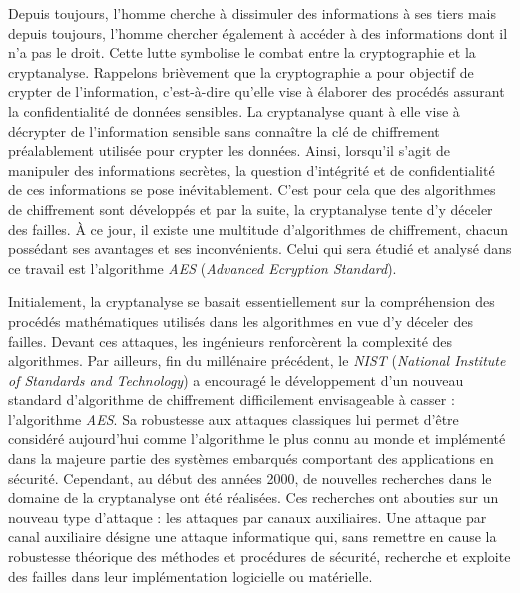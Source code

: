\documentclass[oneside]{book}
\begin{document}
Depuis toujours, l’homme cherche à dissimuler des informations à ses tiers mais depuis toujours, l’homme chercher également à accéder à des informations dont il n’a pas le droit. Cette lutte symbolise le combat entre la cryptographie et la cryptanalyse. Rappelons brièvement que la cryptographie a pour objectif de crypter de l’information, c’est-à-dire qu’elle vise à élaborer des procédés assurant la confidentialité de données sensibles. La cryptanalyse quant à elle vise à décrypter de l'information sensible sans connaître la clé de chiffrement préalablement utilisée pour crypter les données. Ainsi, lorsqu'il s'agit de manipuler des informations secrètes, la question d'intégrité et de confidentialité de ces informations se pose inévitablement. C'est pour cela que des algorithmes de chiffrement sont développés et par la suite, la cryptanalyse tente d'y déceler des failles. À ce jour, il existe une multitude d'algorithmes de chiffrement, chacun possédant ses avantages et ses inconvénients. Celui qui sera étudié et analysé dans ce travail est l'algorithme \textit{AES} (\textit{Advanced Ecryption Standard}).

Initialement, la cryptanalyse se basait essentiellement sur la compréhension des procédés mathématiques utilisés dans les algorithmes en vue d'y déceler des failles. Devant ces attaques, les ingénieurs renforcèrent la complexité des algorithmes. Par ailleurs, fin du millénaire précédent, le \textit{NIST} (\textit{National Institute of Standards and Technology}) a encouragé le développement d’un nouveau standard d’algorithme de chiffrement difficilement envisageable à casser : l’algorithme \textit{AES}. Sa robustesse aux attaques classiques lui permet d'être considéré aujourd’hui comme l'algorithme le plus connu au monde et implémenté dans la majeure partie des systèmes embarqués comportant des applications en sécurité. Cependant, au début des années 2000, de nouvelles recherches dans le domaine de la cryptanalyse ont été réalisées. Ces recherches ont abouties sur un nouveau type d'attaque : les attaques par canaux auxiliaires. Une attaque par canal auxiliaire désigne une attaque informatique qui, sans remettre en cause la robustesse théorique des méthodes et procédures de sécurité, recherche et exploite des failles dans leur implémentation logicielle ou matérielle. 
\end{document}
